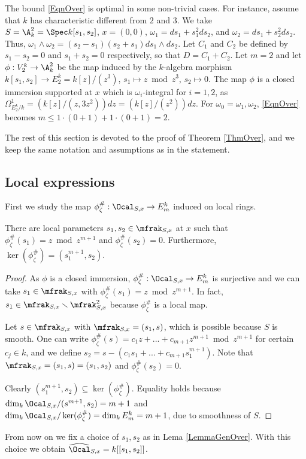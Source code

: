 \begin{remark}
\notready \label{RmkSharp} The bound \eqref{EqnOver} is optimal in some non-trivial cases. For instance, assume that $k$ has characteristic different from $2$ and $3$.  We take $S=\A^2_k=\Spec k[s_1,s_2]$, $x=(0,0)$, $\omega_1=ds_1+s_1^2ds_2$, and $\omega_2=ds_1+s_2^2ds_2$. Thus, $\omega_1\wedge\omega_2 = (s_2-s_1)(s_2+s_1)ds_1\wedge ds_2$. Let $C_1$ and $C_2$ be defined by $s_1-s_2=0$ and $s_1+s_2=0$ respectively, so that $D=C_1+C_2$. Let $m=2$ and let $\phi :V_2^k\to \A^2_k$ be the map induced by the $k$-algebra morphism $k[s_1,s_2]\to E_2^k=k[z]/(z^3)$, $s_1\mapsto z\bmod z^3$, $s_2\mapsto 0$. The map $\phi$ is a closed immersion supported at $x$ which is $\omega_i$-integral for $i=1,2$, as $\Omega^1_{E_2^k/k}=(k[z]/(z,3z^2))dz=(k[z]/(z^2))dz$. For $\omega_0=\omega_1,\omega_2$,  \eqref{EqnOver} becomes $m\le 1\cdot (0+1) + 1\cdot (0+1)=2$.
\end{remark}

The rest of this section is devoted to the proof of Theorem \ref{ThmOver}, and we keep the same notation and assumptions as in the statement.

\subsection{Local expressions} First we study the map $\phi_\zeta^\#:\Ocal_{S,x}\to E_m^k$ induced on local rings.
\begin{lemma}
\notready \label{LemmaGenOver} There are local parameters $s_1,s_2\in \mfrak_{S,x}$ at $x$ such that $\phi^\#_\zeta(s_1)=z \bmod z^{m+1}$ and $\phi^\#_\zeta(s_2)=0$. Furthermore, $\ker(\phi^\#_\zeta)=(s_1^{m+1},s_2)$.
\end{lemma}
\begin{proof} As $\phi$ is a closed immersion, $\phi^\#_\zeta:\Ocal_{S,x}\to E_m^k$ is surjective and we can take $s_1\in \mfrak_{S,x}$ with $\phi^\#_\zeta(s_1)=z\bmod z^{m+1}$. In fact, $s_1\in \mfrak_{S,x}\smallsetminus \mfrak_{S,x}^2$ because $\phi^\#_\zeta$ is a local map.

Let $s\in \mfrak_{S,x}$ with $\mfrak_{S,x}=(s_1,s)$, which is possible because $S$ is smooth.  One can write $\phi^\#_\zeta(s)=c_1z+...+c_{m+1} z^{m+1}\bmod z^{m+1}$ for certain $c_j\in k$, and we define $s_2=s -  (c_1s_1+...+c_{m+1} s_1^{m+1})$. Note that $\mfrak_{S,x}=(s_1,s)=(s_1,s_2)$ and $\phi^\#_\zeta(s_2)=0$.

Clearly $(s_1^{m+1},s_2)\subseteq \ker(\phi^\#_\zeta)$. Equality holds because  $\dim_k \Ocal_{S,x}/(s^{m+1},s_2)=m+1$ and $\dim_k \Ocal_{S,x}/\ker(\phi^\#_\zeta)=\dim_k E_m^k=m+1$, due to smoothness of $S$.
\end{proof}
From now on we fix a choice of $s_1,s_2$ as in Lema \ref{LemmaGenOver}. With this choice we obtain $\widehat{\Ocal}_{S,x}=k[[s_1,s_2]]$.

